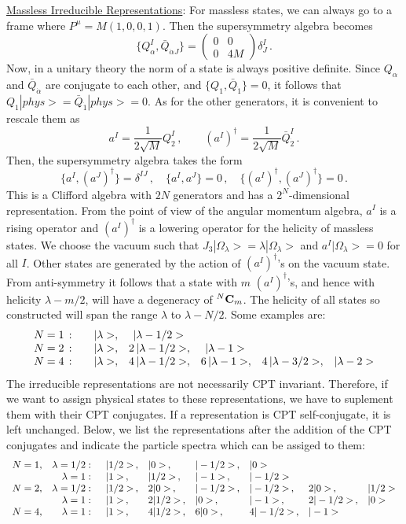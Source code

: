 \noindent\underline{Massless Irreducible Representations}:
\noindent For massless states, we can always go to a frame where
$P^{\mu} = M (1,0,0,1)$. Then the supersymmetry algebra becomes 
$$
\{ Q^{I}_{\alpha}, \bar{Q}_{\dot{\alpha}J} \} =
\left ( \begin{array}{lr}
0 & 0 \\ 0 & 4M \end{array} \right )
\delta^{I}_{J}\,.
$$
Now, in a unitary theory the norm of a state is always positive
definite. Since $Q_\alpha$ and $\bar Q_{\dot\alpha}$ are conjugate to
each other, and $\{ Q_{1}, \bar{Q}_{\dot{1}}\}=0$, it follows that 
$Q_1|phys>= \bar{Q}_{\dot{1}}|phys> =0$. As for the other generators,
it is convenient to rescale them as  
$$
a^I=\frac{1}{2\sqrt{M}}Q^I_2\,,\qquad
(a^I)^\dagger=\frac{1}{2\sqrt{M}}\bar Q^I_{\dot 2}\,.
$$
Then, the supersymmetry algebra takes the form
$$
\{ a^I, (a^J)^\dagger \} = \delta^{IJ}\,,\quad  \{ a^I, a^J \}=0\,,
\quad \{ (a^I)^\dagger, (a^J)^\dagger \} = 0\,.
$$
This is a Clifford algebra with $2N$ generators and has a
$2^{N}$-dimensional representation. From the point of view of the
angular momentum algebra, $a^I$ is a rising operator and
$(a^I)^\dagger$ is a lowering operator for the helicity of massless
states. We choose the vacuum such that $J_3|\Omega_\lambda>=\lambda 
|\Omega_\lambda>$ and $a^I|\Omega_\lambda>=0$ for all $I$. Other
states are generated by the action of $(a^I)^\dagger$'s on the vacuum
state. From anti-symmetry it follows that a state with $m$
$(a^I)^\dagger$'s, and hence with helicity $\lambda -m/2$, will have a
degeneracy of $^N{\bf C}_m$. The helicity of all states so constructed
will span the range $\lambda$ to $\lambda-N/2$. Some examples are:
$$
\begin{array}{rrrrrr}
N = 1\,:& \quad |\lambda >,&    |\lambda-1/2>\hphantom{,}& & &\\
N = 2\,:& \quad |\lambda >,& 2\,|\lambda-1/2>,&|\lambda -1>\hphantom{,}&&\\ 
N = 4\,:& \quad |\lambda >,& 4\,|\lambda-1/2>,&
6\,|\lambda -1 >,&4\,|\lambda - 3/2>,& |\lambda -2 >
\end{array}
$$
The irreducible representations are not necessarily CPT
invariant. Therefore, if we want to assign physical states to these
representations, we have to suplement them with their CPT conjugates.
If a representation is CPT self-conjugate, it is left unchanged.  
Below, we list the representations after the addition of the CPT
conjugates and indicate the particle spectra which can be assiged to
them:
$$
\begin{array}{lrllllll}
N=1,&\lambda=1/2:&\,\,\, |1/2>\,,&|0>\,,   &|-1/2>\,,&|0>\hphantom{,}&& \\
    &\lambda=1:&\,\,\,|1> \,,&|1/2>\,, &|-1>\,,  &|-1/2>\hphantom{,}&& \\
N=2,&\lambda=1/2:&\,\,\,|1/2>\,,&2|0>\,,&|-1/2>\,,&|-1/2>\,,&2|0>\,,&|1/2>\\
    &\lambda=1:&\,\,\, |1> \,,&2|1/2>\,,&|0>\,,   &|-1>\,, &2|-1/2>\,,&|0>\\
N=4,&\lambda=1:&\,\,\, |1>\,,&4|1/2>\,,&6|0>\,,&4|-1/2>\,,&|-1>\hphantom{,}&
\end{array}
$$
